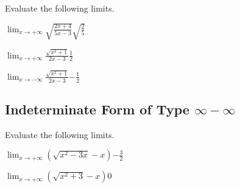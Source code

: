 \noindent Evaluate the following limits.

\problemans%
{$\displaystyle \lim_{x\rightarrow+\infty} \sqrt{\frac{2x + 4}{5x - 3}}$}{$\sqrt{\frac{2}{5}}$}

\problemans%
{$\displaystyle \lim_{x\rightarrow+\infty} \frac{\sqrt{x^2 + 1}}{2x - 3}$}{$\frac{1}{2}$}

\problemans%
{$\displaystyle \lim_{x\rightarrow-\infty} \frac{\sqrt{x^2 + 1}}{2x - 3}$}{$-\frac{1}{2}$}


\makenewpage\subsection{Indeterminate Form of Type $\infty - \infty$}

\noindent Evaluate the following limits.

\problemans%
{$\displaystyle \lim_{x\rightarrow+\infty} \left(\sqrt{x^2-3x} - x\right)$}{$-\frac{3}{2}$}

\problemans%
{$\displaystyle \lim_{x\rightarrow+\infty} \left(\sqrt{x^2+3} - x\right)$}{$0$}

